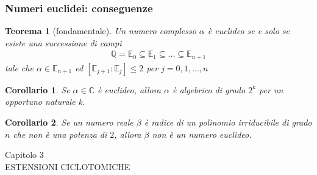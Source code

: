 \documentclass[11pt]{beamer}
\newtheorem{teorema}{Teorema}
\newtheorem{corollario}{Corollario}
\begin{document}



\begin{frame}
\frametitle{Numeri euclidei: conseguenze}

\begin{teorema}[fondamentale]
Un numero complesso $\alpha$ è euclideo se e solo se esiste una successione di campi 
\begin{align*}
\mathbb{Q} = \mathbb{E}_0 \subseteq \mathbb{E}_1 \subseteq ... \subseteq  \mathbb{E}_{n+1}  
\end{align*}
\noindent
tale che $\alpha \in  \mathbb{E}_{n+1}$ ed    $[\mathbb{E}_{j+1}: \mathbb{E}_{j}] \leq 2$ per $j = 0, 1, ... , n $
\end{teorema}

\begin{corollario}
Se $\alpha \in \mathbb{C}$ è euclideo, allora $\alpha$ è algebrico di grado $2^k$ per un opportuno naturale k.
\end{corollario}


\begin{corollario}
Se un numero reale $\beta$ è radice di un polinomio irriducibile di grado $n$ che non è una potenza di $2$, allora $\beta$ non è un numero euclideo.
\end{corollario}

\end{frame}



\begin{frame}
\begin{center}
Capitolo 3 \\ESTENSIONI CICLOTOMICHE
\end{center}
\end{frame}
\end{document}
